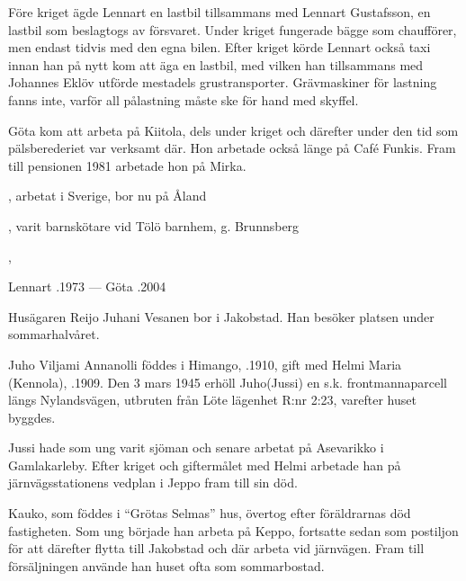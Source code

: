 Före kriget ägde Lennart en lastbil tillsammans med Lennart Gustafsson, en lastbil som beslagtogs av försvaret. Under kriget fungerade bägge som chaufförer, men endast tidvis med den egna bilen. Efter kriget körde Lennart också taxi innan han på nytt kom att äga en lastbil, med vilken han tillsammans med Johannes Eklöv utförde mestadels grustransporter. Grävmaskiner för lastning fanns inte, varför all pålastning måste ske för hand med skyffel.

Göta kom att arbeta på Kiitola, dels under kriget och därefter under den tid som pälsberederiet var verksamt där. Hon arbetade också länge på Café Funkis. Fram till pensionen 1981 arbetade hon på Mirka.
\begin{jhchildren}
  \item {}, arbetat i Sverige, bor nu på Åland
  \item {}, varit barnskötare vid Tölö barnhem, g. Brunnsberg
  \item {},
\end{jhchildren}

Lennart .1973  ---  Göta .2004





Husägaren Reijo Juhani Vesanen bor i Jakobstad. Han besöker platsen under sommarhalvåret.\jhvspace{}


Juho Viljami Annanolli föddes i Himango, .1910, gift med Helmi Maria (Kennola), .1909. Den 3 mars 1945 erhöll Juho(Jussi) en s.k. frontmannaparcell längs Nylandsvägen, utbruten från Löte lägenhet R:nr 2:23, varefter huset byggdes.

Jussi hade som ung varit sjöman och senare arbetat på Asevarikko i Gamlakarleby. Efter kriget och giftermålet med Helmi arbetade han på järnvägsstationens vedplan i Jeppo fram till sin död.
\begin{jhchildren}
  \item {}
  \item {}
\end{jhchildren}
Kauko, som föddes i ``Grötas Selmas'' hus, övertog efter föräldrarnas död fastigheten. Som ung började han arbeta på Keppo, fortsatte sedan som postiljon för att därefter flytta till Jakobstad och där arbeta vid järnvägen. Fram till försäljningen använde han huset ofta som sommarbostad.

